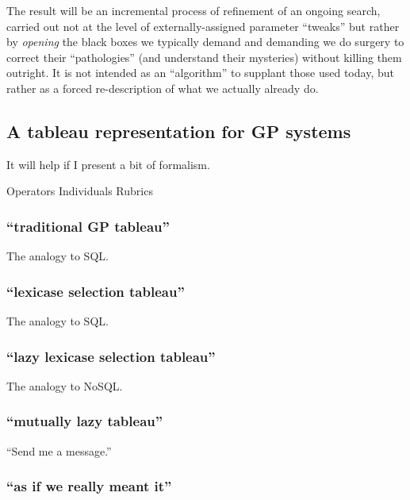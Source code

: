 The result will be an incremental process of refinement of an ongoing search, carried out not at the level of externally-assigned parameter ``tweaks'' but rather by \emph{opening} the black boxes we typically demand and demanding we do surgery to correct their ``pathologies'' (and understand their mysteries) without killing them outright. It is not intended as an ``algorithm'' to supplant those used today, but rather as a forced re-description of what we actually already do.

\subsection{A tableau representation for GP systems}\hypertarget{a-tableau-representation-for-gp-systems}{}\label{a-tableau-representation-for-gp-systems}

It will help if I present a bit of formalism.

Operators
Individuals
Rubrics

\subsubsection{``traditional GP tableau''}\hypertarget{traditional-gp-tableau}{}\label{traditional-gp-tableau}

The analogy to SQL.

\subsubsection{``lexicase selection tableau''}\hypertarget{lexicase-selection-tableau}{}\label{lexicase-selection-tableau}

The analogy to SQL.

\subsubsection{``lazy lexicase selection tableau''}\hypertarget{lazy-lexicase-selection-tableau}{}\label{lazy-lexicase-selection-tableau}

The analogy to NoSQL.

\subsubsection{``mutually lazy tableau''}\hypertarget{mutually-lazy-tableau}{}\label{mutually-lazy-tableau}

``Send me a message.''

\subsubsection{``as if we really meant it''}\hypertarget{as-if-we-really-meant-it-1}{}\label{as-if-we-really-meant-it-1}

